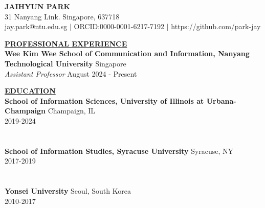 \documentclass{article}
\begin{document}
\begin{center}
\thispagestyle{empty}
\large \textbf{JAIHYUN PARK \\}
\normalsize 31 Nanyang Link. Singapore, 637718 \\ 
\normalsize jay.park@ntu.edu.sg $\mid$ ORCID:0000-0001-6217-7192 $\mid$ https://github.com/park-jay \\
\hrulefill
\end{center}


\noindent \textbf{\underline{PROFESSIONAL EXPERIENCE}} \\
\noindent \textbf{Wee Kim Wee School of Communication and Information, Nanyang Technological University} \hfill Singapore \\
\noindent \textit{Assistant Professor} \hfill August 2024 - Present

\vspace{0.5cm}

\noindent \textbf{\underline{EDUCATION}} \\
\noindent \textbf{School of Information Sciences, University of Illinois at Urbana-Champaign} \hfill Champaign, IL \\
 \hfill 2019-2024\\
\\
 \\


\noindent \textbf{School of Information Studies, Syracuse University} \hfill Syracuse, NY \\
 \hfill 2017-2019 \\
 \hfill \\
 \\

\noindent \textbf{Yonsei University} \hfill Seoul, South Korea \\
 \hfill 2010-2017 \\
 \hfill \\
\end{document}

